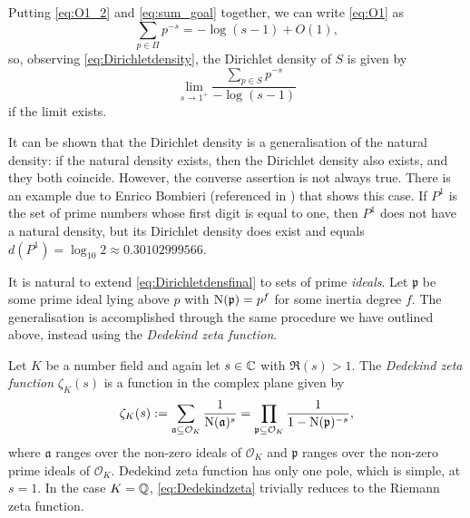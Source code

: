 \documentclass[../main.tex]{subfiles}
\begin{document}
Putting \cref{eq:O1_2} and \cref{eq:sum_goal} together, we can write \cref{eq:O1} as
\begin{equation*}
	\sum_{p\in \Pi}p^{-s}=-\log(s-1)+O(1),
\end{equation*}
so, observing \cref{eq:Dirichletdensity}, the Dirichlet density of $S$ is given by 
\begin{equation}\label{eq:Dirichletdensfinal}
	\lim_{s\rightarrow1^+}\frac{\sum_{p\in S}p^{-s}}{-\log(s-1)}
\end{equation}
if the limit exists. 

It can be shown that the Dirichlet density is a generalisation of the natural density: if the natural density exists, then the Dirichlet density also exists, and they both coincide. However, the converse assertion is not always true. There is an example due to Enrico Bombieri (referenced in \cite{Serre}) that shows this case. If $P^1$ is the set of prime numbers whose first digit is equal to one, then $P^1$ does not have a natural density, but its Dirichlet density does exist and equals $d(P^1)=\log_{10}2\approx0.30102999566$.

 It is natural to extend \cref{eq:Dirichletdensfinal} to sets of prime \emph{ideals}. Let $\mathfrak{p}$ be some prime ideal lying above $p$ with $\operatorname{N}(\mathfrak{p})=p^f$ for some inertia degree $f$. The generalisation is accomplished through the same procedure we have outlined above, instead using the \emph{Dedekind zeta function}.
  
Let $K$ be a number field and again let $s\in \mathbb{C}$ with $\Re(s)>1$. The \emph{Dedekind zeta function} $\zeta_K(s)$ is a function in the complex plane given by
	\begin{equation}\label{eq:Dedekindzeta}
		\zeta_K(s):=\sum_{\mathfrak{a}\subseteq\mathcal{O}_K}\frac{1}{\operatorname{N}(\mathfrak{a})^{s}}=\prod_{\mathfrak{p}\subseteq\mathcal{O}_K}\frac{1}{1-\operatorname{N}(\mathfrak{p})^{-s}},
	\end{equation}
	where $\mathfrak{a}$ ranges over the non-zero ideals of $\mathcal{O}_K$ and $\mathfrak{p}$ ranges over the non-zero prime ideals of $\mathcal{O}_K$. Dedekind zeta function has only one pole, which is simple, at $s=1$. In the case $K=\mathbb{Q}$, \cref{eq:Dedekindzeta} trivially reduces to the Riemann zeta function.
\end{document}
